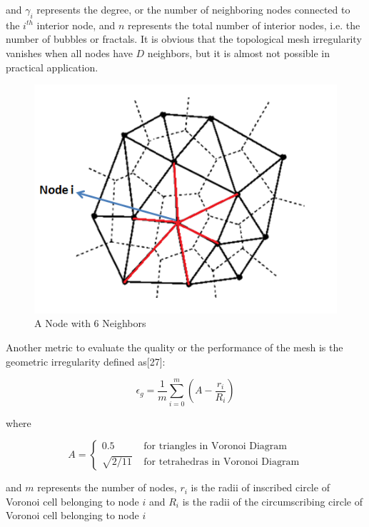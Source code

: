 and $\gamma _i$ represents the degree, or the number of neighboring nodes connected to the $i^{th}$ interior node, and $n$ represents the total number of interior nodes, i.e. the number of bubbles or fractals. It is obvious that the topological mesh irregularity vanishes when all nodes have $D$ neighbors, but it is almost not possible in practical application. 
	
\begin{figure}[H]
\caption{A Node with 6 Neighbors}
\centering
\includegraphics[scale = 0.70]{voronoi}
\end{figure}

Another metric to evaluate the quality or the performance of the mesh is the geometric irregularity defined as[27]:

\begin{equation}
\epsilon _g = \frac{1}{m} \sum_{i = 0}^{m} (A-\frac{r_i}{R_i})
\end{equation}

where
 
\begin{equation}
A = \left\{ \begin{array}{rl}
0.5                               &\mbox{ for triangles in Voronoi Diagram} \\
\sqrt{2/11}                   &\mbox{ for tetrahedras in Voronoi Diagram}
\end{array} \right.
\end{equation}
		
and $m$ represents the number of nodes, $r_i$ is the radii of inscribed circle of Voronoi cell belonging to node $i$ and $R_i$ is the radii of the circumscribing circle of Voronoi cell belonging to node $i$
	
